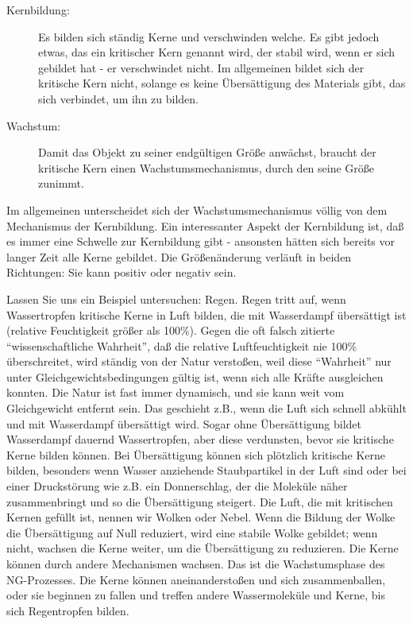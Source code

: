 \begin{description} 
\item[Kernbildung:] Es bilden sich ständig Kerne und verschwinden welche.
Es gibt jedoch etwas, das ein kritischer Kern genannt wird, der stabil wird, wenn er sich gebildet hat - er verschwindet nicht.
Im allgemeinen bildet sich der kritische Kern nicht, solange es keine Übersättigung des Materials gibt, das sich verbindet, um ihn zu bilden.

\item[Wachstum:] Damit das Objekt zu seiner endgültigen Größe anwächst, braucht der kritische Kern einen Wachstumsmechanismus, durch den seine Größe zunimmt.
\end{description}

Im allgemeinen unterscheidet sich der Wachstumsmechanismus völlig von dem Mechanismus der Kernbildung.
Ein interessanter Aspekt der Kernbildung ist, daß es immer eine Schwelle zur Kernbildung gibt - ansonsten hätten sich bereits vor langer Zeit alle Kerne gebildet.
Die Größenänderung verläuft in beiden Richtungen: Sie kann positiv oder negativ sein.

Lassen Sie uns ein Beispiel untersuchen: Regen.
Regen tritt auf, wenn Wassertropfen kritische Kerne in Luft bilden, die mit Wasserdampf übersättigt ist (relative Feuchtigkeit größer als 100\%).
Gegen die oft falsch zitierte \enquote{wissenschaftliche Wahrheit}, daß die relative Luftfeuchtigkeit nie 100\% überschreitet, wird ständig von der Natur verstoßen, weil diese \enquote{Wahrheit} nur unter Gleichgewichtsbedingungen gültig ist, wenn sich alle Kräfte ausgleichen konnten.
Die Natur ist fast immer dynamisch, und sie kann weit vom Gleichgewicht entfernt sein.
Das geschieht z.B., wenn die Luft sich schnell abkühlt und mit Wasserdampf übersättigt wird.
Sogar ohne Übersättigung bildet Wasserdampf dauernd Wassertropfen, aber diese verdunsten, bevor sie kritische Kerne bilden können.
Bei Übersättigung können sich plötzlich kritische Kerne bilden, besonders wenn Wasser anziehende Staubpartikel in der Luft sind oder bei einer Druckstörung wie z.B. ein Donnerschlag, der die Moleküle näher zusammenbringt und so die Übersättigung steigert.
Die Luft, die mit kritischen Kernen gefüllt ist, nennen wir Wolken oder Nebel.
Wenn die Bildung der Wolke die Übersättigung auf Null reduziert, wird eine stabile Wolke gebildet; wenn nicht, wachsen die Kerne weiter, um die Übersättigung zu reduzieren.
Die Kerne können durch andere Mechanismen wachsen.
Das ist die Wachstumsphase des NG-Prozesses.
Die Kerne können aneinanderstoßen und sich zusammenballen, oder sie beginnen zu fallen und treffen andere Wassermoleküle und Kerne, bis sich Regentropfen bilden.

